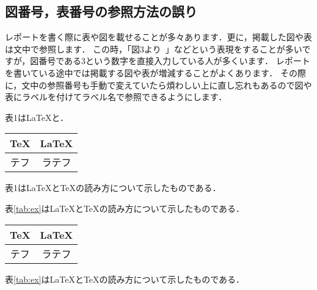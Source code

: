 \documentclass[dvipdfmx,uplatex]{jsarticle}
\begin{document}
{\subsection{図番号，表番号の参照方法の誤り}
レポートを書く際に表や図を載せることが多々あります．更に，掲載した図や表は文中で参照します．
この時，「図3より~」などという表現をすることが多いですが，図番号である3という数字を直接入力している人が多くいます．
レポートを書いている途中では掲載する図や表が増減することがよくあります．
その際に，文中の参照番号も手動で変えていたら煩わしい上に直し忘れもあるので図や表にラベルを付けてラベル名で参照できるようにします．
\begin{tcolorbox}[title=参照番号]
  \begin{tcolorbox}[title=label refを使用しない, colframe=wrongcolor]
    \begin{excode}
      表1は\LaTeX と．
    \end{excode}
    \begin{center}
      \label{tab:ex}
      \begin{tabular}{c|c}
        \TeX & \LaTeX \\ \hline
        テフ & ラテフ
      \end{tabular}
    \end{center}
  表1は\LaTeX と\TeX の読み方について示したものである．
  \end{tcolorbox}
  \begin{tcolorbox}[title=label refを使用する, colframe=correctcolor]
    \begin{excode}
      表\ref{tab:ex}は\LaTeX と\TeX の読み方について示したものである．
    \end{excode}
    \begin{center}
      \label{tab:ex}
      \begin{tabular}{c|c}
        \TeX & \LaTeX \\ \hline
        テフ & ラテフ
      \end{tabular}
    \end{center}
    表\ref{tab:ex}は\LaTeX と\TeX の読み方について示したものである．
  \end{tcolorbox}
\end{tcolorbox}

}
\end{document}
